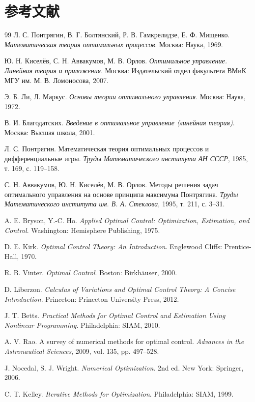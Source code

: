 \documentclass[UTF8,a4paper,zihao=-4]{ctexart}
\begin{document}
\section{参考文献}

\begin{thebibliography}{99}
Л. С. Понтрягин, В. Г. Болтянский, Р. В. Гамкрелидзе, Е. Ф. Мищенко.
\newblock \emph{Математическая теория оптимальных процессов}.
\newblock Москва: Наука, 1969.

Ю. Н. Киселёв, С. Н. Аввакумов, М. В. Орлов.
\newblock \emph{Оптимальное управление. Линейная теория и приложения}.
\newblock Москва: Издательский отдел факультета ВМиК МГУ им. М. В. Ломоносова, 2007.

Э. Б. Ли, Л. Маркус.
\newblock \emph{Основы теории оптимального управления}.
\newblock Москва: Наука, 1972.

В. И. Благодатских.
\newblock \emph{Введение в оптимальное управление (линейная теория)}.
\newblock Москва: Высшая школа, 2001.

Л. С. Понтрягин.
\newblock Математическая теория оптимальных процессов и дифференциальные игры.
\newblock \emph{Труды Математического института АН СССР}, 1985, т. 169, с. 119--158.

С. Н. Аввакумов, Ю. Н. Киселёв, М. В. Орлов.
\newblock Методы решения задач оптимального управления на основе принципа максимума Понтрягина.
\newblock \emph{Труды Математического института им. В. А. Стеклова}, 1995, т. 211, с. 3--31.

A. E. Bryson, Y.-C. Ho.
\newblock \emph{Applied Optimal Control: Optimization, Estimation, and Control}.
\newblock Washington: Hemisphere Publishing, 1975.

D. E. Kirk.
\newblock \emph{Optimal Control Theory: An Introduction}.
\newblock Englewood Cliffs: Prentice-Hall, 1970.

R. B. Vinter.
\newblock \emph{Optimal Control}.
\newblock Boston: Birkhäuser, 2000.

D. Liberzon.
\newblock \emph{Calculus of Variations and Optimal Control Theory: A Concise Introduction}.
\newblock Princeton: Princeton University Press, 2012.

J. T. Betts.
\newblock \emph{Practical Methods for Optimal Control and Estimation Using Nonlinear Programming}.
\newblock Philadelphia: SIAM, 2010.

A. V. Rao.
\newblock A survey of numerical methods for optimal control.
\newblock \emph{Advances in the Astronautical Sciences}, 2009, vol. 135, pp. 497--528.

J. Nocedal, S. J. Wright.
\newblock \emph{Numerical Optimization}. 2nd ed.
\newblock New York: Springer, 2006.

C. T. Kelley.
\newblock \emph{Iterative Methods for Optimization}.
\newblock Philadelphia: SIAM, 1999.
\end{thebibliography}
\end{document}
